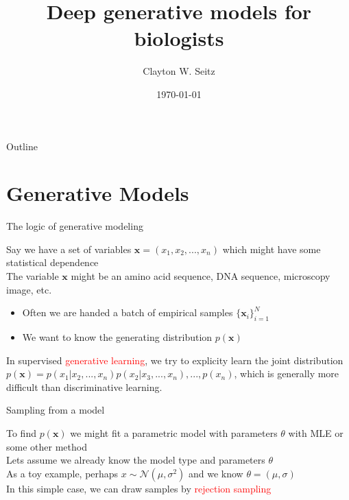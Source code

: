 \documentclass{beamer}					%
\title{Deep generative models for biologists}	%
\author{Clayton W. Seitz}								%
\date{\today}									%
\begin{document}
\begin{frame}
  \titlepage
\end{frame}

\begin{frame}{Outline}
  \tableofcontents
\end{frame}

%


\section{Generative Models}

\begin{frame}{The logic of generative modeling}

Say we have a set of variables $\mathbf{x} = (x_{1},x_{2},...,x_{n})$ which might have some statistical dependence\\
\vspace{0.1in}
The variable $\mathbf{x}$ might be an amino acid sequence, DNA sequence, microscopy image, etc.\\
\vspace{0.1in}
\begin{itemize}
\item Often we are handed a batch of empirical samples $\{\mathbf{x}_{i}\}_{i=1}^{N}$
\item We want to know the generating distribution $p(\mathbf{x})$
\end{itemize}

In supervised \textcolor{red}{generative learning}, we try to explicity learn the joint distribution $p(\mathbf{x})=p(x_{1}|x_{2},...,x_{n})p(x_{2}|x_{3},...,x_{n}),...,p(x_{n})$, which is generally more difficult than discriminative learning. 

\end{frame}

\begin{frame}{Sampling from a model}

To find $p(\mathbf{x})$ we might fit a parametric model with parameters $\theta$ with MLE or some other method\\
\vspace{0.1in}
Lets assume we already know the model type and parameters $\theta$\\
\vspace{0.2in}
As a toy example, perhaps $x\sim \mathcal{N}(\mu,\sigma^{2})$ and we know $\theta = (\mu,\sigma)$\\
\vspace{0.1in}
In this simple case, we can draw samples by \textcolor{red}{rejection sampling}
\end{frame}
\end{document}
